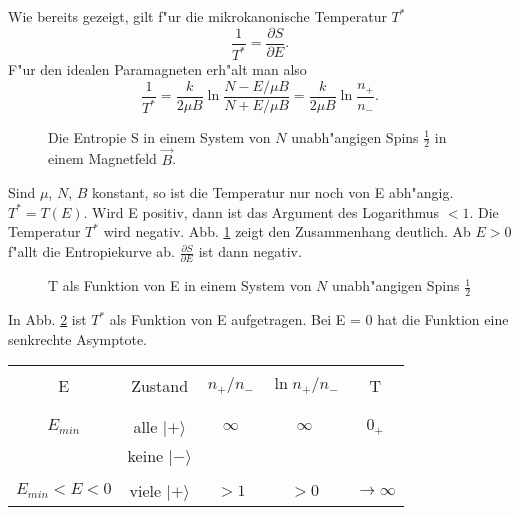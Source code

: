 \documentclass[12pt]{article}
\begin{document}
\begin{module}[id=mytemparature,uses=probability-intro]
Wie bereits gezeigt, gilt f"ur die mikrokanonische Temperatur $T^*$ 
\begin{equation}
\frac{1}{T^*} =\frac{\partial S}{\partial E}.
\end{equation}
F"ur den idealen Paramagneten erh"alt man also
\begin{equation}
\frac{1}{T^*} = \frac{k}{2 \mu B} \ln \frac{N - E/\mu B}{N+E/\mu B} =
\frac{k}{2\mu B} \ln \frac{n_+}{n_-}.
\end{equation} 
\begin{figure} 
\centerline{}
\caption{Die Entropie S in einem System von $N$ unabh"angigen Spins $\frac{1}{2}$
in einem Magnetfeld $\vec B$.}
\label{entr}
\end{figure}
Sind $\mu$, $N$, $B$ konstant, so ist die Temperatur nur noch von E abh"angig.
$T^* = T(E)$. Wird E positiv, dann ist das Argument des Logarithmus $<1$. Die
Temperatur $T^*$ wird negativ. Abb. \ref{entr} zeigt den Zusammenhang deutlich.
Ab $E>0$ f"allt die Entropiekurve ab. $\frac{\partial S}{\partial E}$ ist dann
negativ.
\begin{figure} 
\centerline{}
\caption{T als Funktion von E in einem System von $N$ unabh"angigen Spins
$\frac{1}{2}$}
\label{t}
\end{figure}
In Abb. \ref{t} ist $T^*$ als Funktion von E aufgetragen. Bei E = 0 hat die 
Funktion eine senkrechte Asymptote. 
\begin{table} 
\begin{center}
\begin{tabular}{|c|c|c|c|c|}
     \hline
                  &                  &           &           &\\
     E & Zustand & $n_+ /  n_-$ & $\ln n_+ / n_-$ & T \\
                  &                  &           &           &\\
     \hline     
     \hline
                  &                  &           &           &\\
     $E_{min}    $&alle   $|+\rangle$&$\infty$   &$\infty$   &$0_+$\\
                  &keine   $|-\rangle$&          &           &     \\
     \hline     
                  &                  &           &           &\\
     $E_{min}<E<0$&viele  $|+\rangle$&$>1$       &$>0$       &$\to\infty$ \\

\end{tabular}
\end{center}
\end{table}
\end{module}
\end{document}
